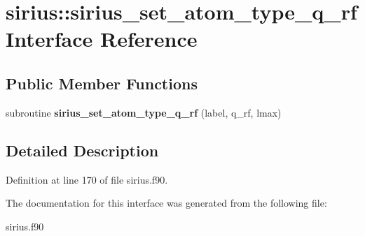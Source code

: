 \hypertarget{interfacesirius_1_1sirius__set__atom__type__q__rf}{}\section{sirius\+:\+:sirius\+\_\+set\+\_\+atom\+\_\+type\+\_\+q\+\_\+rf Interface Reference}
\label{interfacesirius_1_1sirius__set__atom__type__q__rf}
\subsection*{Public Member Functions}
\begin{DoxyCompactItemize}
\item 
\hypertarget{interfacesirius_1_1sirius__set__atom__type__q__rf_a8e215f98dda0bb6ee7c5abcfaa6647dd}{}subroutine {\bfseries sirius\+\_\+set\+\_\+atom\+\_\+type\+\_\+q\+\_\+rf} (label, q\+\_\+rf, lmax)\label{interfacesirius_1_1sirius__set__atom__type__q__rf_a8e215f98dda0bb6ee7c5abcfaa6647dd}

\end{DoxyCompactItemize}


\subsection{Detailed Description}


Definition at line 170 of file sirius.\+f90.



The documentation for this interface was generated from the following file\+:\begin{DoxyCompactItemize}
\item 
sirius.\+f90\end{DoxyCompactItemize}
